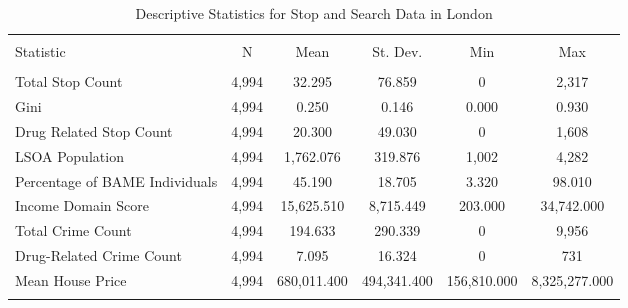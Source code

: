 
\begin{table}[!htbp] \centering 
  \caption{Descriptive Statistics for Stop and Search Data in London} 
  \label{tab:descriptive_london} 
\begin{tabular}{@{\extracolsep{5pt}}lccccc} 
\\[-1.8ex]\hline 
\hline \\[-1.8ex] 
Statistic & \multicolumn{1}{c}{N} & \multicolumn{1}{c}{Mean} & \multicolumn{1}{c}{St. Dev.} & \multicolumn{1}{c}{Min} & \multicolumn{1}{c}{Max} \\ 
\hline \\[-1.8ex] 
Total Stop Count & 4,994 & 32.295 & 76.859 & 0 & 2,317 \\ 
Gini & 4,994 & 0.250 & 0.146 & 0.000 & 0.930 \\ 
Drug Related Stop Count & 4,994 & 20.300 & 49.030 & 0 & 1,608 \\ 
LSOA Population & 4,994 & 1,762.076 & 319.876 & 1,002 & 4,282 \\ 
Percentage of BAME Individuals & 4,994 & 45.190 & 18.705 & 3.320 & 98.010 \\ 
Income Domain Score & 4,994 & 15,625.510 & 8,715.449 & 203.000 & 34,742.000 \\ 
Total Crime Count & 4,994 & 194.633 & 290.339 & 0 & 9,956 \\ 
Drug-Related Crime Count & 4,994 & 7.095 & 16.324 & 0 & 731 \\ 
Mean House Price & 4,994 & 680,011.400 & 494,341.400 & 156,810.000 & 8,325,277.000 \\ 
\hline \\[-1.8ex] 
\end{tabular} 
\end{table} 
